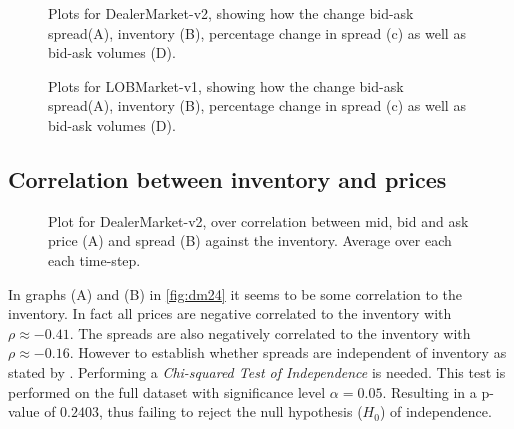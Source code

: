 \documentclass{kththesis}
\theoremstyle{definition}
\begin{document}
\begin{figure}
	    	\centering
		
		\caption{Plots for DealerMarket-v2, showing how the change bid-ask spread(A), inventory (B), percentage change in spread (c) as well as bid-ask volumes (D).}
		\label{fig:dm22}
\end{figure}

\begin{figure}
	    	\centering
		
		\caption{Plots for LOBMarket-v1, showing how the change bid-ask spread(A), inventory (B), percentage change in spread (c) as well as bid-ask volumes (D).}
		\label{fig:dm32}
\end{figure}


\newpage
\subsection*{Correlation between inventory and prices}

\begin{figure}[H]
	    	\centering
		
		\caption{Plot for DealerMarket-v2, over correlation between mid, bid and ask price (A) and spread (B) against the inventory. Average over each each time-step.}
		\label{fig:dm24}
\end{figure}
In graphs (A) and (B) in \autoref{fig:dm24} it seems to be some correlation to the inventory. In fact all prices are negative correlated to the inventory with $\rho \approx -0.41$. The spreads are also negatively correlated to the inventory with $\rho\approx - 0.16$. However to establish whether spreads are independent of inventory as stated by \textcite{ho1981optimal}. Performing a \textit{Chi-squared Test of Independence} is needed. This test is performed on the full dataset with significance level $\alpha = 0.05$. Resulting in a p-value of $0.2403$, thus failing to reject the null hypothesis ($H_{0}$) of independence. 
\end{document}
